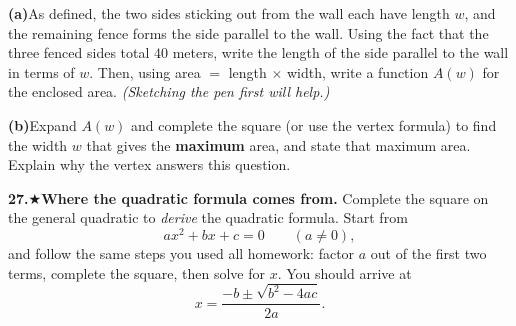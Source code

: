 \documentclass[12pt]{article}
\begin{document}
\medskip
\textbf{(a)}\quad As defined, the two sides sticking out from the wall each have length $w$, and the remaining fence forms the
side parallel to the wall. Using the fact that the three fenced sides total $40$ meters, write the length of the
side parallel to the wall in terms of $w$. Then, using area $=$ length $\times$ width, write a function $A(w)$ for
the enclosed area. \textit{(Sketching the pen first will help.)}
\vspace{10cm}

\newpage
\textbf{(b)}\quad Expand $A(w)$ and complete the square (or use the vertex formula) to find the width $w$ that gives
the \textbf{maximum} area, and state that maximum area. Explain why the vertex answers this question.

\newpage
\textbf{27.}\quad$\bigstar$\quad \textbf{Where the quadratic formula comes from.} Complete the square on the general
quadratic to \emph{derive} the quadratic formula. Start from
\[
  ax^2 + bx + c = 0 \qquad (a \neq 0),
\]
and follow the same steps you used all homework: factor $a$ out of the first two terms, complete the square, then
solve for $x$. You should arrive at
\[
  x = \frac{-b \pm \sqrt{b^2 - 4ac}}{2a}.
\]
\end{document}
